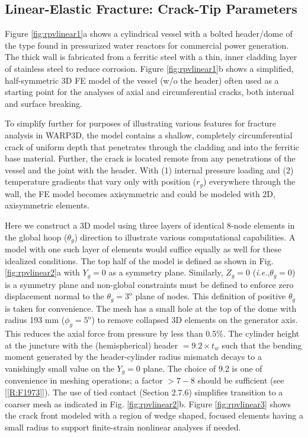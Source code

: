 \documentclass[11pt]{report}
\numberwithin{equation}{section}
\newcommand{\degree } {\mathrm{o} }  %
\newcommand{\ie}{\emph{i.e.},\xspace}
\newcommand{\nid}{\noindent}
\begin{document}
{\subsection{Linear-Elastic Fracture: Crack-Tip Parameters}  

\nid Figure \ref{fig:rpvlinear1}a shows a cylindrical vessel with a bolted header/dome
of the type found in pressurized water
reactors for commercial power generation. The thick wall is fabricated
from a ferritic steel with a thin, inner cladding layer of stainless steel to reduce
corrosion. Figure  \ref{fig:rpvlinear1}b shows a simplified, half-symmetric 3D FE model of the 
vessel (w/o the header) often used as a starting point for the analyses of axial and circumferential cracks, both 
internal and surface breaking. 

To simplify further for purposes of illustrating various features for fracture
analysis in WARP3D, the model contains a shallow, completely circumferential crack of uniform depth
that penetrates through the cladding and into the ferritic base material. Further, the crack is located 
remote from any penetrations of the vessel and the
joint with the header. With 
(1) internal pressure loading and (2) temperature gradients that vary only with position
($r_g$) everywhere through the wall, the FE model becomes axisymmetric and could be modeled with
2D, axisymmetric elements. 

Here we construct a 3D model using three layers of identical 8-node elements in the global hoop
($\theta_g$) direction to illustrate various computational capabilities. A model with one such layer
of elements would suffice equally as well for these idealized conditions. The top half of the model is defined as
shown in Fig. \ref{fig:rpvlinear2}a with $Y_g=0$ as a symmetry plane. Similarly, $Z_g=0$ (\ie $\theta_g=0$) 
is a symmetry 
plane and non-global constraints must be defined to enforce zero displacement normal to the 
$\theta_g=3^{\degree}$ plane of nodes. This definition of positive $\theta_g$ is taken for convenience.
The mesh has
a small hole at the top of the dome with radius 193 mm ($\phi_g=5^{\degree}$) to 
remove collapsed 3D elements  on the
generator axis. This reduces the axial force from pressure by less than 0.5\%. The cylinder height at the juncture
with the  (hemispherical)
header $=9.2 \times t_w$ such that the bending moment generated by the 
header-cylinder radius mismatch decays to a vanishingly small value on the $Y_g=0$
plane. The choice of 9.2 is one of convenience in meshing operations; a factor $> 7-8$ should
be sufficient (see [\ref{R:F1973}]). 
 The use of tied contact
(Section 2.7.6) simplifies transition to a coarser mesh as indicated in Fig. \ref{fig:rpvlinear2}b.
Figure \ref{fig:rpvlinear3} shows the crack front modeled with a region of wedge 
shaped, focused elements having a small 
radius to support finite-strain nonlinear analyses if needed. 


}
\end{document}
